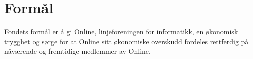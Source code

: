 \chapter{Formål}

Fondets formål er å gi Online, linjeforeningen for informatikk, en økonomisk trygghet og sørge for at Online sitt økonomiske overskudd fordeles rettferdig på nåværende og fremtidige medlemmer av Online.
